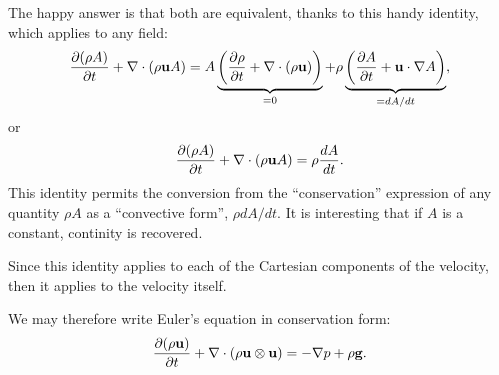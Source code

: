The happy answer is that both are equivalent, thanks to this handy
identity, which applies to any field:
\[
\frac{\partial ( \rho  A ) }{\partial t} +
\nabla  \cdot ( \rho \bfu A) =
%
A
\underbrace{
\left(
\frac{\partial \rho }{\partial t} +
\nabla  \cdot ( \rho \bfu ) 
\right)}_{=0}  +
\rho 
\underbrace{
\left(
\frac{\partial A }{\partial t} +
\bfu \cdot \nabla  A
\right) }_{=dA/dt}  ,
\]
or
\begin{equation}
  \label{eq:conserv_to_total}
  \frac{\partial ( \rho  A ) }{\partial t} +
  \nabla  \cdot ( \rho \mathbf{u} A) =
  \rho \frac{d  A }{d t} .
\end{equation}
This identity permits the conversion from the ``conservation''
expression of any quantity $\rho A$ as a ``convective form'', $\rho
dA/dt$. It is interesting that if $A$ is a constant, continity is
recovered.

Since this identity applies to each of the Cartesian components of the
velocity, then it applies to the velocity itself.

We may therefore write Euler's equation in conservation form:
\[
\frac{\partial  (\rho \mathbf{u} ) }{\partial t} +
 \nabla \cdot ( \rho \mathbf{u} \otimes \mathbf{u} ) =
 - \nabla p 
 + \rho \mathbf{g} .
\]



